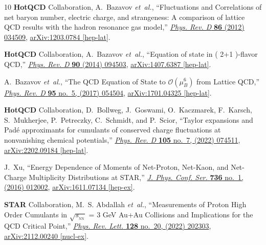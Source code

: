 \documentclass[a4paper,12pt]{article}
\numberwithin{equation}{section}
\begin{document}
\begin{thebibliography}{10}
	{\bfseries HotQCD} Collaboration, A.~Bazavov {\em et~al.}, ``{Fluctuations and
		Correlations of net baryon number, electric charge, and strangeness: A
		comparison of lattice QCD results with the hadron resonance gas model},''
	\href{http://dx.doi.org/10.1103/PhysRevD.86.034509}{{\em Phys. Rev. D}
		{\bfseries 86} (2012) 034509},
	\href{http://arxiv.org/abs/1203.0784}{{\ttfamily arXiv:1203.0784 [hep-lat]}}.
	
	{\bfseries HotQCD} Collaboration, A.~Bazavov {\em et~al.}, ``{Equation of state
		in ( 2+1 )-flavor QCD},''
	\href{http://dx.doi.org/10.1103/PhysRevD.90.094503}{{\em Phys. Rev. D}
		{\bfseries 90} (2014) 094503},
	\href{http://arxiv.org/abs/1407.6387}{{\ttfamily arXiv:1407.6387 [hep-lat]}}.
	
	A.~Bazavov {\em et~al.}, ``{The QCD Equation of State to $\mathcal{O}(\mu_B^6)$
		from Lattice QCD},'' \href{http://dx.doi.org/10.1103/PhysRevD.95.054504}{{\em
			Phys. Rev. D} {\bfseries 95} no.~5, (2017) 054504},
	\href{http://arxiv.org/abs/1701.04325}{{\ttfamily arXiv:1701.04325
			[hep-lat]}}.
	
	{\bfseries HotQCD} Collaboration, D.~Bollweg, J.~Goswami, O.~Kaczmarek,
	F.~Karsch, S.~Mukherjee, P.~Petreczky, C.~Schmidt, and P.~Scior, ``{Taylor
		expansions and Pad\'e approximants for cumulants of conserved charge
		fluctuations at nonvanishing chemical potentials},''
	\href{http://dx.doi.org/10.1103/PhysRevD.105.074511}{{\em Phys. Rev. D}
		{\bfseries 105} no.~7, (2022) 074511},
	\href{http://arxiv.org/abs/2202.09184}{{\ttfamily arXiv:2202.09184
			[hep-lat]}}.
	
	J.~Xu, ``{Energy Dependence of Moments of Net-Proton, Net-Kaon, and Net-Charge
		Multiplicity Distributions at STAR},''
	\href{http://dx.doi.org/10.1088/1742-6596/736/1/012002}{{\em J. Phys. Conf.
			Ser.} {\bfseries 736} no.~1, (2016) 012002},
	\href{http://arxiv.org/abs/1611.07134}{{\ttfamily arXiv:1611.07134
			[hep-ex]}}.
	
	{\bfseries STAR} Collaboration, M.~S. Abdallah {\em et~al.}, ``{Measurements of
		Proton High Order Cumulants in $\sqrt{s_{_{\mathrm{NN}}}}$ = 3 GeV Au+Au
		Collisions and Implications for the QCD Critical Point},''
	\href{http://dx.doi.org/10.1103/PhysRevLett.128.202303}{{\em Phys. Rev.
			Lett.} {\bfseries 128} no.~20, (2022) 202303},
	\href{http://arxiv.org/abs/2112.00240}{{\ttfamily arXiv:2112.00240
			[nucl-ex]}}.
	

\end{thebibliography}
\end{document}
